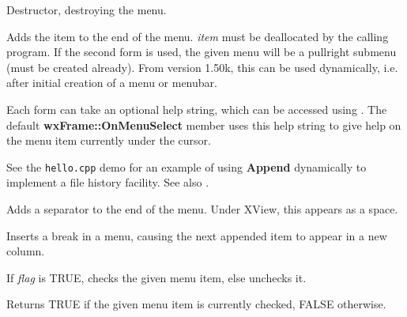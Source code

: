 

Destructor, destroying the menu.

\label{wxmenuappend}



Adds the item to the end of the menu. {\it item} must be deallocated by the calling
program.  If the second form is used, the given menu will be a pullright submenu (must be
created already). From version 1.50k, this can be used dynamically, i.e. after initial
creation of a menu or menubar.

Each form can take an optional help string, which can be accessed using
. The default {\bf wxFrame::OnMenuSelect} member
uses this help string to give help on the menu item currently under the
cursor.

See the {\tt hello.cpp} demo for an example of using {\bf Append} dynamically
to implement a file history facility. See also .



Adds a separator to the end of the menu. Under XView, this appears as
a space.



Inserts a break in a menu, causing the next appended item to appear in a new column.



If {\it flag} is TRUE, checks the given menu item, else unchecks it.



Returns TRUE if the given menu item is currently checked, FALSE otherwise.


